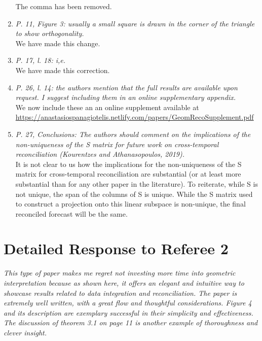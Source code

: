 \documentclass[a4paper,11pt]{article}
\begin{document}
\begin{enumerate}
	    The comma has been removed.\\
	
	    \item \textit{P. 11, Figure 3: usually a small square is drawn in the corner of the triangle to show orthogonality.}\\
	
	    We have made this change.\\
	
	    \item \textit{P. 17, l. 18: i,e.}\\
	
	    We have made this correction.\\
	
	    \item \textit{P. 26, l. 14: the authors mention that the full results are available upon request. I suggest including them in an online supplementary appendix.}\\
	
	    We now include these an an online supplement available at\\ \href{https://anastasiospanagiotelis.netlify.com/papers/GeomRecoSupplement.pdf}{https://anastasiospanagiotelis.netlify.com/papers/GeomRecoSupplement.pdf}\\
	
	    \item \textit{P. 27, Conclusions: The authors should comment on the implications of the non-uniqueness of the S matrix for future work on cross-temporal reconciliation (Kourentzes and Athanasopoulos, 2019).}\\
	
	    It is not clear to us how the implications for the non-uniqueness of the S matrix for cross-temporal reconciliation are substantial (or at least more substantial than for any other paper in the literature).  To reiterate, while S is not unique, the span of the columns of S is unique.  While the S matrix used to construct a projection onto this linear subspace is non-unique, the final reconciled forecast will be the same.\\
	
    \end{enumerate}

    \section*{Detailed Response to Referee 2}

	\noindent \textit{This type of paper makes me regret not investing more time into geometric interpretation because as shown here, it offers an elegant and intuitive way to showcase results related to data integration and reconciliation. The paper is extremely well written, with a great flow and thoughtful considerations. Figure 4 and its description are exemplary successful in their simplicity and effectiveness. The discussion of theorem 3.1 on page 11 is another example of thoroughness and clever insight.}\\
	
\end{document}
